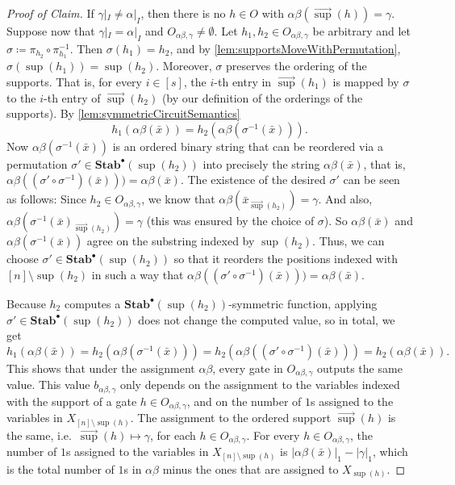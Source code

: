 \documentclass[11pt]{article}
\DeclareMathOperator{\supp}{sup}
\newcommand{\StabP}{\mathbf{Stab}^{\bullet}}
\theoremstyle{definition}
\theoremstyle{plain}
\theoremstyle{remark}
\newenvironment{claimproof}[1][Proof of Claim]{\begin{proof}[#1] \renewcommand{\qedsymbol}{$\lrcorner$}}{ \end{proof}}
\theoremstyle{remark}
\begin{document}
\begin{claimproof}
	If $\gamma|_I \neq \alpha|_I$, then there is no $h \in O$ with $\alpha\beta(\vec{\supp}(h)) = \gamma$.
	Suppose now that $\gamma|_I = \alpha|_I$ and $O_{\alpha\beta, \gamma} \neq \emptyset$. 
	Let $h_1, h_2 \in O_{\alpha\beta, \gamma}$ be arbitrary and let $\sigma \coloneqq \pi_{h_2} \circ \pi_{h_1}^{-1}$. Then $\sigma(h_1) = h_2$, and by \cref{lem:supportsMoveWithPermutation}, $\sigma(\supp(h_1)) = \supp(h_2)$. Moreover, $\sigma$ preserves the ordering of the supports. That is, for every $i \in [s]$, the $i$-th entry in $\vec{\supp}(h_1)$ is mapped by $\sigma$ to the $i$-th entry of $\vec{\supp}(h_2)$ (by our definition of the orderings of the supports).  
	By \cref{lem:symmetricCircuitSemantics} 
	\[
	h_1(\alpha\beta(\bar{x})) = h_2(\alpha\beta(\sigma^{-1}(\bar{x}))).
	\]
	Now $\alpha\beta(\sigma^{-1}(\bar{x}))$ is an ordered binary string that can be reordered via a permutation $\sigma' \in \StabP(\supp(h_2))$ into precisely the string $\alpha\beta(\bar{x})$, that is, $\alpha\beta((\sigma' \circ\sigma^{-1})(\bar{x}))) = \alpha\beta(\bar{x})$. The existence of the desired $\sigma'$ can be seen as follows: Since $h_2 \in O_{\alpha\beta, \gamma}$, we know that $\alpha\beta(\bar{x}_{\vec{\supp}(h_2)}) = \gamma$. And also, $\alpha\beta(\sigma^{-1}(\bar{x})_{\vec{\supp}(h_2)}) = \gamma$ (this was ensured by the choice of $\sigma$). So $\alpha\beta(\bar{x})$ and $\alpha\beta(\sigma^{-1}(\bar{x}))$ agree on the substring indexed by $\supp(h_2)$. Thus, we can choose $\sigma' \in \StabP(\supp(h_2))$ so that it reorders the positions indexed with $[n] \setminus \supp(h_2)$ in such a way that $\alpha\beta((\sigma' \circ\sigma^{-1})(\bar{x}))) = \alpha\beta(\bar{x})$.
	
	Because $h_2$ computes a $\StabP(\supp(h_2))$-symmetric function, applying $\sigma' \in \StabP(\supp(h_2))$ does not change the computed value, so in total, we get
	\[
	h_1(\alpha\beta(\bar{x})) = h_2(\alpha\beta(\sigma^{-1}(\bar{x}))) = h_2(\alpha\beta((\sigma' \circ\sigma^{-1})(\bar{x}))) = h_2(\alpha\beta(\bar{x})).
	\]
	This shows that under the assignment $\alpha\beta$, every gate in $O_{\alpha\beta,\gamma}$ outputs the same value. 
	This value $b_{\alpha\beta, \gamma}$ only depends on the assignment to the variables indexed with the support of a gate $h \in O_{\alpha\beta, \gamma}$, and on the number of $1$s assigned to the variables in $X_{[n] \setminus \supp(h)}$. The assignment to the ordered support $\vec{\supp}(h)$ 
	is the same, i.e.\ $\vec{\supp}(h) \mapsto \gamma$, for each $h \in O_{\alpha\beta, \gamma}$. For every $h \in O_{\alpha\beta,\gamma}$, the number of $1$s assigned to the variables in $X_{[n] \setminus \supp(h)}$ is $|\alpha\beta(\bar{x})|_1 - |\gamma|_1$, which is the total number of $1$s in $\alpha\beta$ minus the ones that are assigned to $X_{\supp(h)}$.
\end{claimproof}
\end{document}
